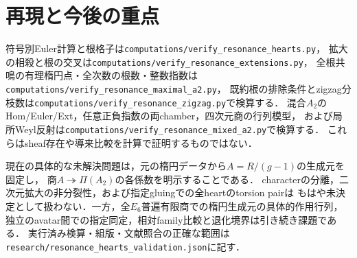 \section{再現と今後の重点}
符号別Euler計算と根格子は\texttt{computations/verify\_resonance\_hearts.py}，
拡大の相殺と根の交叉は\texttt{computations/verify\_resonance\_extensions.py}，
全根共鳴の有理楕円点・全次数の根数・整数指数は
\texttt{computations/verify\_resonance\_maximal\_a2.py}，
既約根の排除条件とzigzag分枝数は\texttt{computations/verify\_resonance\_zigzag.py}で検算する．
混合$A_2$のHom/Euler/Ext，任意正負指数の両chamber，四次元商の行列模型，
および局所Weyl反射は\texttt{computations/verify\_resonance\_mixed\_a2.py}で検算する．
これらはsheaf存在や導来比較を計算で証明するものではない．

現在の具体的な未解決問題は，元の楕円データから$A=R/(g-1)$の生成元を固定し，
商$A\twoheadrightarrow\Pi(A_2)$の各係数を明示することである．
characterの分離，二次元拡大の非分裂性，および指定gluingでの全heartのtorsion pairは
もはや未決定として扱わない．一方，全$E_6$普遍有限商での楕円生成元の具体的作用行列，独立のavatar間での指定同定，相対family比較と退化境界は引き続き課題である．
実行済み検算・組版・文献照合の正確な範囲は
\texttt{research/resonance\_hearts\_validation.json}に記す．

